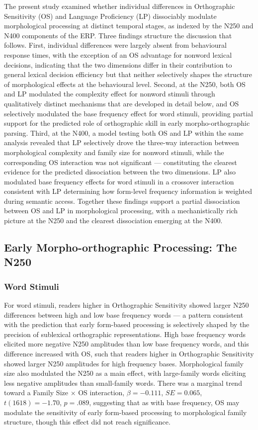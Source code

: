 \documentclass[utf8]{FrontiersinHarvard} %
\begin{document}
	The present study examined whether individual differences in Orthographic Sensitivity (OS) and Language Proficiency (LP) dissociably modulate morphological processing at distinct temporal stages, as indexed by the N250 and N400 components of the ERP. Three findings structure the discussion that follows. First, individual differences were largely absent from behavioural response times, with the exception of an OS advantage for nonword lexical decisions, indicating that the two dimensions differ in their contribution to general lexical decision efficiency but that neither selectively shapes the structure of morphological effects at the behavioural level. Second, at the N250, both OS and LP modulated the complexity effect for nonword stimuli through qualitatively distinct mechanisms that are developed in detail below, and OS selectively modulated the base frequency effect for word stimuli, providing partial support for the predicted role of orthographic skill in early morpho-orthographic parsing. Third, at the N400, a model testing both OS and LP within the same analysis revealed that LP selectively drove the three-way interaction between morphological complexity and family size for nonword stimuli, while the corresponding OS interaction was not significant --- constituting the clearest evidence for the predicted dissociation between the two dimensions. LP also modulated base frequency effects for word stimuli in a crossover interaction consistent with LP determining how form-level frequency information is weighted during semantic access. Together these findings support a partial dissociation between OS and LP in morphological processing, with a mechanistically rich picture at the N250 and the clearest dissociation emerging at the N400.
	
	\subsection{Early Morpho-orthographic Processing: The N250}
	
	\subsubsection{Word Stimuli}
	
	For word stimuli, readers higher in Orthographic Sensitivity showed larger N250 differences between high and low base frequency words --- a pattern consistent with the prediction that early form-based processing is selectively shaped by the precision of sublexical orthographic representations. High base frequency words elicited more negative N250 amplitudes than low base frequency words, and this difference increased with OS, such that readers higher in Orthographic Sensitivity showed larger N250 amplitudes for high frequency bases. Morphological family size also modulated the N250 as a main effect, with large-family words eliciting less negative amplitudes than small-family words. There was a marginal trend toward a Family Size $\times$ OS interaction, $\beta = -0.111$, $SE = 0.065$, $t(1618) = -1.70$, $p = .089$, suggesting that as with base frequency, OS may modulate the sensitivity of early form-based processing to morphological family structure, though this effect did not reach significance.
	
\end{document}
